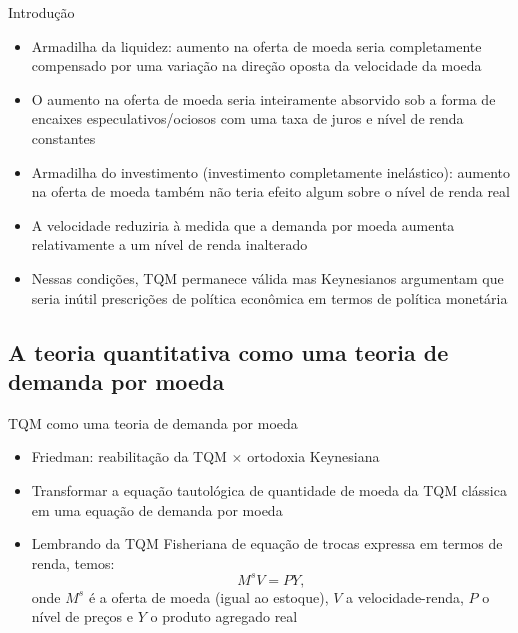 \documentclass[10pt]{beamer}
\begin{document}
\begin{frame}{Introdução}
    \begin{itemize}
        \item Armadilha da liquidez: aumento na oferta de moeda seria completamente compensado por uma variação na direção oposta da velocidade da moeda
        \bigskip
        \item O aumento na oferta de moeda seria inteiramente absorvido sob a forma de encaixes especulativos/ociosos com uma taxa de juros e nível de renda constantes
        \bigskip
        \item Armadilha do investimento (investimento completamente inelástico): aumento na oferta de moeda também não teria efeito algum sobre o nível de renda real
        \bigskip
        \item A velocidade reduziria à medida que a demanda por moeda aumenta relativamente a um nível de renda inalterado \bigskip
        \item Nessas condições, TQM permanece válida mas Keynesianos argumentam que seria inútil prescrições de política econômica em termos de política monetária
    \end{itemize}
\end{frame}

\subsection{A teoria quantitativa como uma teoria de demanda por moeda}
\begin{frame}{TQM como uma teoria de demanda por moeda}
    \begin{itemize}
        \item Friedman: reabilitação da TQM $\times$ ortodoxia Keynesiana
        \bigskip
        \item Transformar a equação tautológica de quantidade de moeda da TQM clássica em uma equação de demanda por moeda
        \bigskip
        \item Lembrando da TQM Fisheriana de equação de trocas expressa em termos de renda, temos:
        \[
        M^sV = PY,
        \]
        onde $M^s$ é a oferta de moeda (igual ao estoque), $V$ a velocidade-renda, $P$ o nível de preços e $Y$ o produto agregado real
    \end{itemize}
\end{frame}
\end{document}
